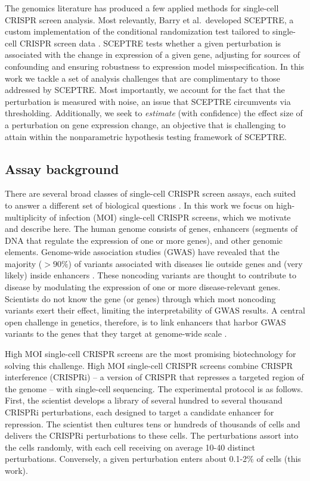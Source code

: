 \documentclass[12pt]{article}
\begin{document}
The genomics literature has produced a few applied methods for single-cell CRISPR screen analysis. Most relevantly, Barry et al.\ developed SCEPTRE, a custom implementation of the conditional randomization test \parencite{Candes2018, Liu2021} tailored to single-cell CRISPR screen data \parencite{Barry2021}. SCEPTRE tests whether a given perturbation is associated with the change in expression of a given gene, adjusting for sources of confounding and ensuring robustness to expression model misspecification. In this work we tackle a set of analysis challenges that are complimentary to those addressed by SCEPTRE. Most importantly, we account for the fact that the perturbation is measured with noise, an issue that SCEPTRE circumvents via thresholding. Additionally, we seek to \textit{estimate} (with confidence) the effect size of a perturbation on gene expression change, an objective that is challenging to attain within the nonparametric hypothesis testing framework of SCEPTRE.

\subsection{Assay background}
There are several broad classes of single-cell CRISPR screen assays, each suited to answer a different set of biological questions \parencite{Gasperini2019,Datlinger2021,Mimitou2019}. In this work we focus on high-multiplicity of infection (MOI) single-cell CRISPR screens, which we motivate and describe here. The human genome consists of genes, enhancers (segments of DNA that regulate the expression of one or more genes), and other genomic elements. Genome-wide association studies (GWAS) have revealed that the majority ($>90\%$) of variants associated with diseases lie outside genes and (very likely) inside enhancers \parencite{Gallagher2018}. These noncoding variants are thought to contribute to disease by modulating the expression of one or more disease-relevant genes. Scientists do not know the gene (or genes) through which most noncoding variants exert their effect, limiting the interpretability of GWAS results. A central open challenge in genetics, therefore, is to link enhancers that harbor GWAS variants to the genes that they target at genome-wide scale \parencite{Gasperini2020}.

High MOI single-cell CRISPR screens are the most promising biotechnology for solving this challenge. High MOI single-cell CRISPR screens combine CRISPR interference (CRISPRi) -- a version of CRISPR that represses a targeted region of the genome -- with single-cell sequencing. The experimental protocol is as follows. First, the scientist develops a library of several hundred to several thousand CRISPRi perturbations, each designed to target a candidate enhancer for repression. The scientist then cultures tens or hundreds of thousands of cells and delivers the CRISPRi perturbations to these cells. The perturbations assort into the cells randomly, with each cell receiving on average 10-40 distinct perturbations. Conversely, a given perturbation enters about 0.1-2\% of cells (this work).
\end{document}
